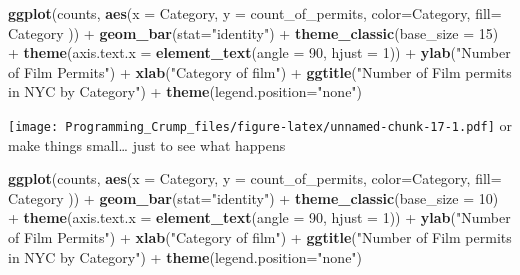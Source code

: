 \documentclass[]{book}
\newenvironment{Shaded}{\begin{snugshade}}{\end{snugshade}}
\newcommand{\KeywordTok}[1]{\textcolor[rgb]{0.13,0.29,0.53}{\textbf{{#1}}}}
\newcommand{\DataTypeTok}[1]{\textcolor[rgb]{0.13,0.29,0.53}{{#1}}}
\newcommand{\DecValTok}[1]{\textcolor[rgb]{0.00,0.00,0.81}{{#1}}}
\newcommand{\StringTok}[1]{\textcolor[rgb]{0.31,0.60,0.02}{{#1}}}
\newcommand{\NormalTok}[1]{{#1}}
\theoremstyle{definition}
\theoremstyle{definition}
\theoremstyle{definition}
\theoremstyle{remark}
\begin{document}
\begin{Shaded}
\begin{Highlighting}[]
\KeywordTok{ggplot}\NormalTok{(counts, }\KeywordTok{aes}\NormalTok{(}\DataTypeTok{x =} \NormalTok{Category, }\DataTypeTok{y =} \NormalTok{count_of_permits, }
                   \DataTypeTok{color=}\NormalTok{Category, }
                   \DataTypeTok{fill=} \NormalTok{Category )) +}
\StringTok{  }\KeywordTok{geom_bar}\NormalTok{(}\DataTypeTok{stat=}\StringTok{"identity"}\NormalTok{) +}\StringTok{ }
\StringTok{  }\KeywordTok{theme_classic}\NormalTok{(}\DataTypeTok{base_size =} \DecValTok{15}\NormalTok{) +}
\StringTok{  }\KeywordTok{theme}\NormalTok{(}\DataTypeTok{axis.text.x =} \KeywordTok{element_text}\NormalTok{(}\DataTypeTok{angle =} \DecValTok{90}\NormalTok{, }\DataTypeTok{hjust =} \DecValTok{1}\NormalTok{)) +}
\StringTok{  }\KeywordTok{ylab}\NormalTok{(}\StringTok{"Number of Film Permits"}\NormalTok{) +}\StringTok{ }
\StringTok{  }\KeywordTok{xlab}\NormalTok{(}\StringTok{"Category of film"}\NormalTok{) +}
\StringTok{  }\KeywordTok{ggtitle}\NormalTok{(}\StringTok{"Number of Film permits in NYC by Category"}\NormalTok{) +}
\StringTok{  }\KeywordTok{theme}\NormalTok{(}\DataTypeTok{legend.position=}\StringTok{"none"}\NormalTok{) }
\end{Highlighting}
\end{Shaded}

\texttt{[image: Programming\_Crump\_files/figure-latex/unnamed-chunk-17-1.pdf]}
or make things small\ldots{} just to see what happens

\begin{Shaded}
\begin{Highlighting}[]
\KeywordTok{ggplot}\NormalTok{(counts, }\KeywordTok{aes}\NormalTok{(}\DataTypeTok{x =} \NormalTok{Category, }\DataTypeTok{y =} \NormalTok{count_of_permits, }
                   \DataTypeTok{color=}\NormalTok{Category, }
                   \DataTypeTok{fill=} \NormalTok{Category )) +}
\StringTok{  }\KeywordTok{geom_bar}\NormalTok{(}\DataTypeTok{stat=}\StringTok{"identity"}\NormalTok{) +}\StringTok{ }
\StringTok{  }\KeywordTok{theme_classic}\NormalTok{(}\DataTypeTok{base_size =} \DecValTok{10}\NormalTok{) +}
\StringTok{  }\KeywordTok{theme}\NormalTok{(}\DataTypeTok{axis.text.x =} \KeywordTok{element_text}\NormalTok{(}\DataTypeTok{angle =} \DecValTok{90}\NormalTok{, }\DataTypeTok{hjust =} \DecValTok{1}\NormalTok{)) +}
\StringTok{  }\KeywordTok{ylab}\NormalTok{(}\StringTok{"Number of Film Permits"}\NormalTok{) +}\StringTok{ }
\StringTok{  }\KeywordTok{xlab}\NormalTok{(}\StringTok{"Category of film"}\NormalTok{) +}
\StringTok{  }\KeywordTok{ggtitle}\NormalTok{(}\StringTok{"Number of Film permits in NYC by Category"}\NormalTok{) +}
\StringTok{  }\KeywordTok{theme}\NormalTok{(}\DataTypeTok{legend.position=}\StringTok{"none"}\NormalTok{) }
\end{Highlighting}
\end{Shaded}
\end{document}
